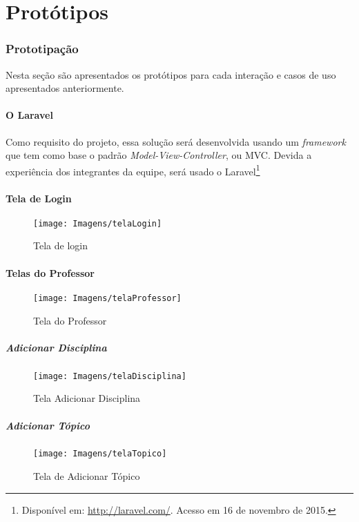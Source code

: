 \documentclass[12pt,oneside,a4paper,article]{abntex2}
\begin{document}
\part{Protótipos}
	\section{Prototipação}
		Nesta seção são apresentados os protótipos para cada interação e casos de uso apresentados anteriormente.
		
		\subsection{O Laravel}
			Como requisito do projeto, essa solução será desenvolvida usando um \textit{framework} que tem como base o padrão \textit{Model-View-Controller}, ou MVC.
			Devida a experiência dos integrantes da equipe, será usado o Laravel\footnote{Disponível em: \url{http://laravel.com/}. Acesso em 16 de novembro de 2015.}
	
		\subsection{Tela de Login}
			\begin{figure}[h]
				\centering
				\texttt{[image: Imagens/telaLogin]}
				\caption{Tela de login}
				\label{fig:telaLogin}
			\end{figure}

		\pagebreak
	
		\subsection{Telas do Professor}
			\begin{figure}[h]
				\centering
				\texttt{[image: Imagens/telaProfessor]}
				\caption{Tela do Professor}
				\label{fig:telaProfessor}
			\end{figure}
			
			\subsubsection{Adicionar Disciplina}
				\begin{figure}[h]
					\centering
					\texttt{[image: Imagens/telaDisciplina]}
					\caption{Tela Adicionar Disciplina}
					\label{fig:telaDisciplina}
				\end{figure}
			
			\subsubsection{Adicionar Tópico}
				\begin{figure}[h]
					\centering
					\texttt{[image: Imagens/telaTopico]}
					\caption{Tela de Adicionar Tópico}
					\label{fig:telaTopico}
				\end{figure}
				
\end{document}
